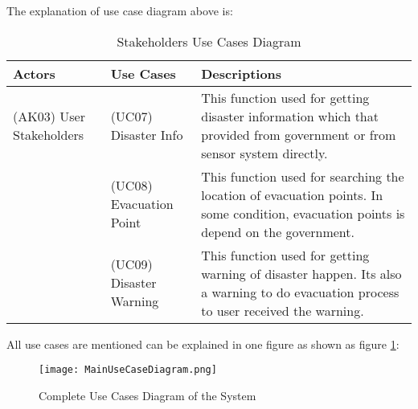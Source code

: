 \begin{enumerate}
The explanation of use case  diagram above is:
\begin{table}[H]
\begin{center}
\caption{Stakeholders Use Cases Diagram}
\label{tab: stkUCDiagram}
	\vspace{0.1cm}
\begin{tabular}{ |>{\centering\arraybackslash}m{2cm}|>{\centering\arraybackslash}m{4cm}|>{\centering\arraybackslash}m{6.5cm}|}
 \hline
 \textbf{Actors} & \textbf{Use Cases} & \textbf{Descriptions} \\
 \hline \hline
  (AK03) User Stakeholders & (UC07) Disaster Info & This function used for getting disaster information which that provided from government or from sensor system directly. \\
 \hline 
 & (UC08) Evacuation Point & This function used for searching the location of evacuation points. In some condition, evacuation points is depend on the government. \\
 \hline
 & (UC09) Disaster Warning & This function used for getting warning of disaster happen. Its also a warning to do evacuation process to user received the warning. \\
 \hline 
\end{tabular}
\end{center}
\end{table}
\end{enumerate}

All use cases are mentioned can be explained in one figure as shown as figure \ref{fig:MainUseCase}:
\begin{figure}[H]
\centering
\texttt{[image: MainUseCaseDiagram.png]}
\label{fig:MainUseCase}
\caption{Complete Use Cases Diagram of the System}
\end{figure}

